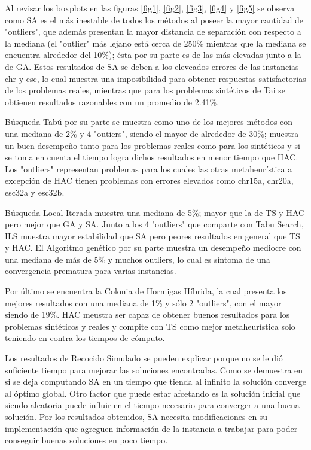 \documentclass{ci5652}
\begin{document}
Al revisar los boxplots en las figuras \ref{fig1}, \ref{fig2}, \ref{fig3}, \ref{fig4} y \ref{fig5} se observa como SA es el más inestable de todos los métodos al poseer la mayor cantidad de "outliers", que además presentan la mayor distancia de separación con respecto a la mediana (el "outlier" más lejano está cerca de 250\% mientras que la mediana se encuentra alrededor del 10\%); ésta por su parte es de las más elevadas junto a la de GA. Estos resultados de SA se deben a los eleveados errores de las instancias chr y esc, lo cual muestra una imposibilidad para obtener respuestas satisfactorias de los problemas reales, mientras que para los problemas sintéticos de Tai se obtienen resultados razonables con un promedio de 2.41\%.

Búsqueda Tabú por su parte se muestra como uno de los mejores métodos con una mediana de 2\% y 4 "outiers", siendo el mayor de alrededor de 30\%; muestra un buen desempeño tanto para los problemas reales como para los sintéticos y si se toma en cuenta el tiempo logra dichos resultados en menor tiempo que HAC. Los "outliers" representan problemas para los cuales las otras metaheurística a excepción de HAC tienen problemas con errores elevados como chr15a, chr20a, esc32a y esc32b.

Búsqueda Local Iterada muestra una mediana de 5\%; mayor que la de TS y HAC pero mejor que GA y SA. Junto a los 4 "outliers" que comparte con Tabu Search, ILS muestra mayor estabilidad que SA pero peores resultados en general que TS y HAC. El Algoritmo genético por su parte muestra un desempeño mediocre con una mediana de más de 5\% y muchos outliers, lo cual es síntoma de una convergencia prematura para varias instancias.

Por último se encuentra la Colonia de Hormigas Híbrida, la cual presenta los mejores resultados con una mediana de 1\% y sólo 2 "outliers", con el mayor siendo de 19\%. HAC meustra ser capaz de obtener buenos resultados para los problemas sintéticos y reales y compite con TS como mejor metaheurística solo teniendo en contra los tiempos de cómputo.
 
Los resultados de Recocido Simulado se pueden explicar porque no se le dió suficiente tiempo para mejorar las soluciones encontradas. Como se demuestra en \cite{7} si se deja computando SA en un tiempo que tienda al infinito la solución converge al óptimo global. Otro factor que puede estar afcetando es la solución inicial que siendo aleatoria puede influir en el tiempo necesario para converger a una buena solución. Por los resultados obtenidos, SA necesita modificaciones en su implementación que agreguen información de la instancia a trabajar para poder conseguir buenas soluciones en poco tiempo.
\end{document}
